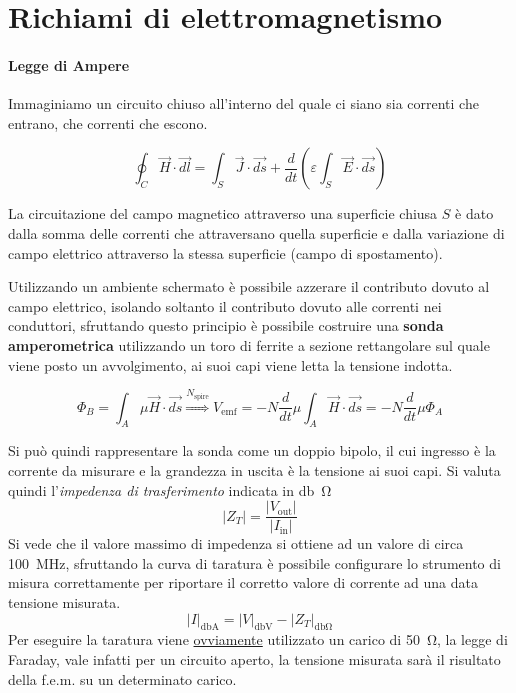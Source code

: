 
\section{Richiami di elettromagnetismo}
\paragraph{Legge di Ampere}
Immaginiamo un circuito chiuso all'interno del quale ci siano
sia correnti che entrano, che correnti che escono. %

$$ %
\oint_C \vec{H} \cdot \vec{dl} = \int_S \vec{J}\cdot \vec{ds} + \frac{d}{dt}\left( \varepsilon \int_S \vec{E}\cdot\vec{ds}\right)
$$

La circuitazione del campo magnetico attraverso una superficie chiusa $S$ è dato dalla somma delle correnti
che attraversano quella superficie e dalla variazione di campo elettrico attraverso la stessa superficie (campo di
spostamento).

Utilizzando un ambiente schermato è possibile azzerare il contributo dovuto al campo elettrico,
isolando soltanto il contributo dovuto alle correnti nei conduttori, sfruttando questo principio
è possibile costruire una \textbf{sonda amperometrica} utilizzando un toro di ferrite a sezione rettangolare
sul quale viene posto un avvolgimento, ai suoi capi viene letta la tensione indotta.

$$
\Phi_B = \int_A \mu\vec{H} \cdot \vec{ds} \stackrel{N_{\text{spire}}}{\Rightarrow} V_{\text{emf}} = -N\frac{d}{dt} \mu \int_A \vec{H} \cdot \vec{ds} = -N\frac{d}{dt}\mu\Phi_A
$$

Si può quindi rappresentare la sonda come un doppio bipolo, il cui ingresso è la corrente da misurare
e la grandezza in uscita è la tensione ai suoi capi.
Si valuta quindi l'\textit{impedenza di trasferimento} indicata in \si{\decibel\ohm}
$$
\left|Z_T\right| = \frac{|V_{\text{out}}|}{|I_{\text{in}}|}
$$
Si vede che il valore massimo di impedenza si ottiene ad un valore di circa \SI{100}{\mega\hertz},
sfruttando la curva di taratura è possibile configurare lo strumento di misura correttamente per
riportare il corretto valore di corrente ad una data tensione misurata.
$$
|I|_{\si{\decibel\ampere}} = |V|_{\si{\decibel\volt}} - |Z_T|_{\si{\decibel\ohm}}
$$
Per eseguire la taratura viene \underline{ovviamente} utilizzato un carico di \SI{50}{\ohm}, 
la legge di Faraday, vale infatti per un circuito aperto, la tensione misurata sarà il risultato
della f.e.m. su un determinato carico.

